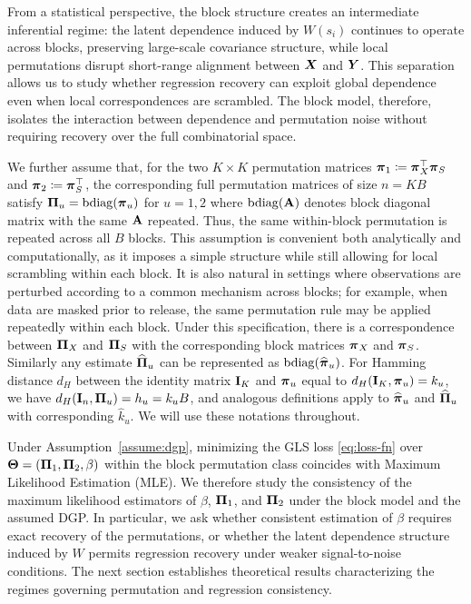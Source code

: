 \documentclass[numsec,webpdf,modern,medium,namedate]{oup-authoring-template}
\theoremstyle{thmstyleone}%
\theoremstyle{thmstyletwo}%
\theoremstyle{thmstylethree}%
\begin{document}
From a statistical perspective, the block structure creates an intermediate inferential regime: the latent dependence induced by $W(s_i)$ continues to operate across blocks, preserving large-scale covariance structure, while local permutations disrupt short-range alignment between $\boldsymbol{X}$ and $\boldsymbol{Y}$. This separation allows us to study whether regression recovery can exploit global dependence even when local correspondences are scrambled. The block model, therefore, isolates the interaction between dependence and permutation noise without requiring recovery over the full combinatorial space.

We further assume that, for the two $K \times K$ permutation matrices $\boldsymbol{\pi}_1 \coloneqq \boldsymbol{\pi}_X^\top \boldsymbol{\pi}_S$ and $\boldsymbol{\pi}_2 \coloneqq \boldsymbol{\pi}_S^\top$, the corresponding full permutation matrices of size $n = KB$ satisfy
$\boldsymbol{\Pi}_u = \operatorname{bdiag}(\boldsymbol{\pi}_u)$ for $ u = 1,2$ where $\operatorname{bdiag}(\mathbf{A})$ denotes block diagonal matrix with the same $\mathbf{A}$ repeated. Thus, the same within-block permutation is repeated across all $B$ blocks. This assumption is convenient both analytically and computationally, as it imposes a simple structure while still allowing for local scrambling within each block. It is also natural in settings where observations are perturbed according to a common mechanism across blocks; for example, when data are masked prior to release, the same permutation rule may be applied repeatedly within each block. Under this specification, there is a correspondence between $\boldsymbol{\Pi}_X$ and $\boldsymbol{\Pi}_S$ with the corresponding block matrices $\boldsymbol{\pi}_X$ and $\boldsymbol{\pi}_S$. Similarly any estimate $\widehat{\boldsymbol{\Pi}}_u$ can be represented as $\mathrm{bdiag}(\widehat{\boldsymbol{\pi}}_u)$. For Hamming distance $d_H$ between the identity  matrix $\mathbf{I}_K$ and $\boldsymbol{\pi}_u$ equal to $d_H(\mathbf{I}_K,\boldsymbol{\pi}_u) = k_u$, we have $d_H(\mathbf{I}_n,\boldsymbol{\Pi}_u) = h_u = k_uB$, and analogous definitions apply to $\widehat{\boldsymbol{\pi}}_u$ and $\widehat{\boldsymbol{\Pi}}_u$ with corresponding $\hat{k}_u$. We will use these notations throughout.

Under Assumption~\ref{assume:dgp}, minimizing the GLS loss \eqref{eq:loss-fn} over $\boldsymbol{\Theta} = (\boldsymbol{\Pi}_1, \boldsymbol{\Pi}_2, \beta)$ within the block permutation class coincides with Maximum Likelihood Estimation (MLE). We therefore study the consistency of the maximum likelihood estimators of $\beta$, $\boldsymbol{\Pi}_1$, and $\boldsymbol{\Pi}_2$ under the block model and the assumed DGP. In particular, we ask whether consistent estimation of $\beta$ requires exact recovery of the permutations, or whether the latent dependence structure induced by $W$ permits regression recovery under weaker signal-to-noise conditions. The next section establishes theoretical results characterizing the regimes governing permutation and regression consistency.
\end{document}
